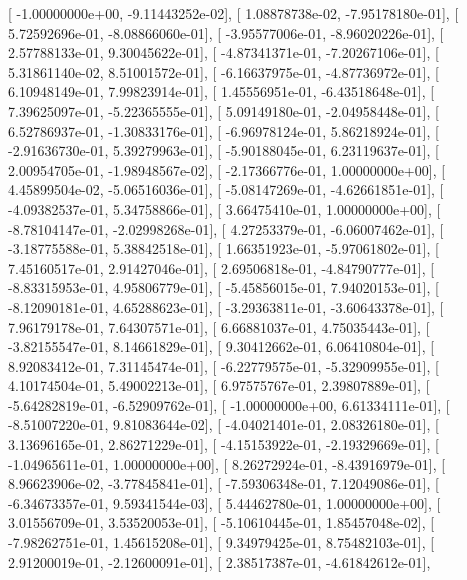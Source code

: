 \documentclass{article}
\begin{document}
       [ -1.00000000e+00,  -9.11443252e-02],
       [  1.08878738e-02,  -7.95178180e-01],
       [  5.72592696e-01,  -8.08866060e-01],
       [ -3.95577006e-01,  -8.96020226e-01],
       [  2.57788133e-01,   9.30045622e-01],
       [ -4.87341371e-01,  -7.20267106e-01],
       [  5.31861140e-02,   8.51001572e-01],
       [ -6.16637975e-01,  -4.87736972e-01],
       [  6.10948149e-01,   7.99823914e-01],
       [  1.45556951e-01,  -6.43518648e-01],
       [  7.39625097e-01,  -5.22365555e-01],
       [  5.09149180e-01,  -2.04958448e-01],
       [  6.52786937e-01,  -1.30833176e-01],
       [ -6.96978124e-01,   5.86218924e-01],
       [ -2.91636730e-01,   5.39279963e-01],
       [ -5.90188045e-01,   6.23119637e-01],
       [  2.00954705e-01,  -1.98948567e-02],
       [ -2.17366776e-01,   1.00000000e+00],
       [  4.45899504e-02,  -5.06516036e-01],
       [ -5.08147269e-01,  -4.62661851e-01],
       [ -4.09382537e-01,   5.34758866e-01],
       [  3.66475410e-01,   1.00000000e+00],
       [ -8.78104147e-01,  -2.02998268e-01],
       [  4.27253379e-01,  -6.06007462e-01],
       [ -3.18775588e-01,   5.38842518e-01],
       [  1.66351923e-01,  -5.97061802e-01],
       [  7.45160517e-01,   2.91427046e-01],
       [  2.69506818e-01,  -4.84790777e-01],
       [ -8.83315953e-01,   4.95806779e-01],
       [ -5.45856015e-01,   7.94020153e-01],
       [ -8.12090181e-01,   4.65288623e-01],
       [ -3.29363811e-01,  -3.60643378e-01],
       [  7.96179178e-01,   7.64307571e-01],
       [  6.66881037e-01,   4.75035443e-01],
       [ -3.82155547e-01,   8.14661829e-01],
       [  9.30412662e-01,   6.06410804e-01],
       [  8.92083412e-01,   7.31145474e-01],
       [ -6.22779575e-01,  -5.32909955e-01],
       [  4.10174504e-01,   5.49002213e-01],
       [  6.97575767e-01,   2.39807889e-01],
       [ -5.64282819e-01,  -6.52909762e-01],
       [ -1.00000000e+00,   6.61334111e-01],
       [ -8.51007220e-01,   9.81083644e-02],
       [ -4.04021401e-01,   2.08326180e-01],
       [  3.13696165e-01,   2.86271229e-01],
       [ -4.15153922e-01,  -2.19329669e-01],
       [ -1.04965611e-01,   1.00000000e+00],
       [  8.26272924e-01,  -8.43916979e-01],
       [  8.96623906e-02,  -3.77845841e-01],
       [ -7.59306348e-01,   7.12049086e-01],
       [ -6.34673357e-01,   9.59341544e-03],
       [  5.44462780e-01,   1.00000000e+00],
       [  3.01556709e-01,   3.53520053e-01],
       [ -5.10610445e-01,   1.85457048e-02],
       [ -7.98262751e-01,   1.45615208e-01],
       [  9.34979425e-01,   8.75482103e-01],
       [  2.91200019e-01,  -2.12600091e-01],
       [  2.38517387e-01,  -4.61842612e-01],
\end{document}
